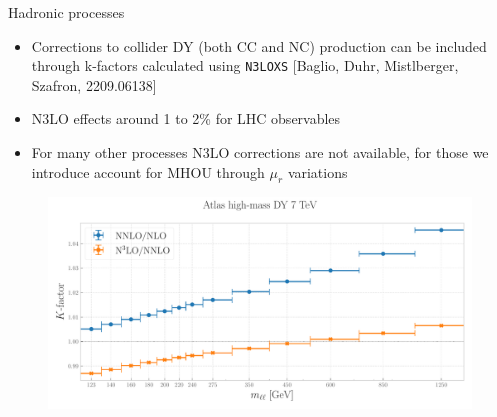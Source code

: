 \documentclass[8pt,t]{beamer}
\begin{document}
\begin{frame}{Hadronic processes}
  \begin{itemize}
    \item Corrections to collider DY (both CC and NC) production can be included through k-factors calculated using \texttt{N3LOXS} {\color{gray}\footnotesize [Baglio, Duhr, Mistlberger, Szafron, 2209.06138]}
    \item N3LO effects around 1 to 2\% for LHC observables
    \item For many other processes N3LO corrections are not available, for those we introduce account for MHOU through $\mu_r$ variations
  \end{itemize}
  \begin{figure}[!t]
    \centering
    \includegraphics[width=.80\textwidth]{figures/kfactor_ATLASZHIGHMASS49FB.pdf}
  \end{figure}
\end{frame}
\end{document}
